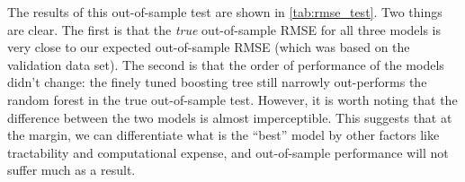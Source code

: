 \documentclass[11pt, fleqn]{article}
\begin{document}
The results of this out-of-sample test are shown in \cref{tab:rmse_test}. Two things are clear. The first is that the \textit{true} out-of-sample RMSE for all three models is very close to our expected out-of-sample RMSE (which was based on the validation data set). The second is that the order of performance of the models didn't change: the finely tuned boosting tree still narrowly out-performs the random forest in the true out-of-sample test. However, it is worth noting that the difference between the two models is almost imperceptible.  This suggests that at the margin, we can differentiate what is the ``best'' model by other factors like tractability and computational expense, and out-of-sample performance will not suffer much as a result.




\end{document}
